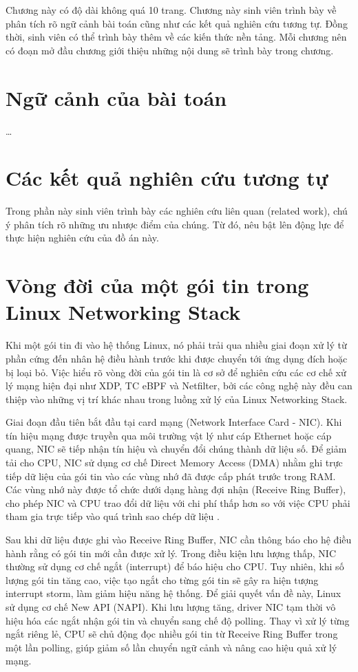 \documentclass[../DoAn.tex]{subfiles}
\begin{document}
Chương này có độ dài không quá 10 trang. Chương này sinh viên trình bày về phân tích rõ ngữ cảnh bài toán cũng như các kết quả nghiên cứu tương tự. Đồng thời, sinh viên có thể trình bày thêm về các kiến thức nền tảng. Mỗi chương nên có đoạn mở đầu chương giới thiệu những nội dung sẽ trình bày trong chương.

\section{Ngữ cảnh của bài toán}
\ldots

\section{Các kết quả nghiên cứu tương tự}
Trong phần này sinh viên trình bày các nghiên cứu liên quan (related work), chú ý phân tích rõ những ưu nhược điểm của chúng. Từ đó, nêu bật lên động lực để thực hiện nghiên cứu của đồ án này.

\section{Vòng đời của một gói tin trong Linux Networking Stack}
Khi một gói tin đi vào hệ thống Linux, nó phải trải qua nhiều giai đoạn xử lý từ phần cứng đến nhân hệ điều hành trước khi được chuyển tới ứng dụng đích hoặc bị loại bỏ. Việc hiểu rõ vòng đời của gói tin là cơ sở để nghiên cứu các cơ chế xử lý mạng hiện đại như XDP, TC eBPF và Netfilter, bởi các công nghệ này đều can thiệp vào những vị trí khác nhau trong luồng xử lý của Linux Networking Stack.

Giai đoạn đầu tiên bắt đầu tại card mạng (Network Interface Card - NIC). Khi tín hiệu mạng được truyền qua môi trường vật lý như cáp Ethernet hoặc cáp quang, NIC sẽ tiếp nhận tín hiệu và chuyển đổi chúng thành dữ liệu số. Để giảm tải cho CPU, NIC sử dụng cơ chế Direct Memory Access (DMA) nhằm ghi trực tiếp dữ liệu của gói tin vào các vùng nhớ đã được cấp phát trước trong RAM. Các vùng nhớ này được tổ chức dưới dạng hàng đợi nhận (Receive Ring Buffer), cho phép NIC và CPU trao đổi dữ liệu với chi phí thấp hơn so với việc CPU phải tham gia trực tiếp vào quá trình sao chép dữ liệu \cite{castillonduperron2025ebpf}.

Sau khi dữ liệu được ghi vào Receive Ring Buffer, NIC cần thông báo cho hệ điều hành rằng có gói tin mới cần được xử lý. Trong điều kiện lưu lượng thấp, NIC thường sử dụng cơ chế ngắt (interrupt) để báo hiệu cho CPU. Tuy nhiên, khi số lượng gói tin tăng cao, việc tạo ngắt cho từng gói tin sẽ gây ra hiện tượng interrupt storm, làm giảm hiệu năng hệ thống. Để giải quyết vấn đề này, Linux sử dụng cơ chế New API (NAPI). Khi lưu lượng tăng, driver NIC tạm thời vô hiệu hóa các ngắt nhận gói tin và chuyển sang chế độ polling. Thay vì xử lý từng ngắt riêng lẻ, CPU sẽ chủ động đọc nhiều gói tin từ Receive Ring Buffer trong một lần polling, giúp giảm số lần chuyển ngữ cảnh và nâng cao hiệu quả xử lý mạng.
\end{document}
